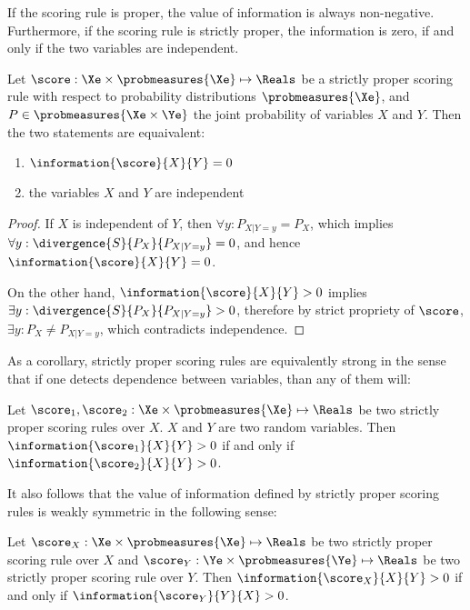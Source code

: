If the scoring rule is proper, the value of information is always non-negative. Furthermore, if the scoring rule is strictly proper, the information is zero, if and only if the two variables are independent.

\begin{theorem}
	Let $\score:\Xe\times\probmeasures{\Xe}\mapsto\Reals$ be a strictly proper scoring rule with respect to probability distributions $\probmeasures{\Xe}$, and $P\in\probmeasures{\Xe\times\Ye}$ the joint probability of variables $X$ and $Y$. Then the two statements are equaivalent:
	\begin{enumerate}
		\item $\information{\score}{X}{Y} = 0$
		\item the variables $X$ and $Y$ are independent
	\end{enumerate}
	\begin{proof}
		If $X$ is independent of $Y$, then $\forall y: P_{X\vert Y=y} = P_{X}$, which implies $\forall y:  \divergence{S}{P_{X}}{P_{X\vert Y=y}}=0$, and hence $\information{\score}{X}{Y} = 0$.
		
		On the other hand, $\information{\score}{X}{Y} > 0$ implies $\exists y: \divergence{S}{P_{X}}{P_{X\vert Y=y}} > 0$, therefore by strict propriety of $\score$, $\exists y: P_X \neq P_{X\vert Y=y}$, which contradicts independence.
	\end{proof}
\end{theorem}

As a corollary, strictly proper scoring rules are equivalently strong in the sense that if one detects dependence between variables, than any of them will:

\begin{corollary}
	Let $\score_1,\score_2:\Xe\times\probmeasures{\Xe}\mapsto\Reals$ be two strictly proper scoring rules over $X$. $X$ and $Y$ are two random variables. Then $\information{\score_1}{X}{Y} > 0$ if and only if $\information{\score_2}{X}{Y} > 0$.
\end{corollary}

It also follows that the value of information defined by strictly proper scoring rules is weakly symmetric in the following sense:

\begin{corollary}
	Let $\score_X:\Xe\times\probmeasures{\Xe}\mapsto\Reals$ be two strictly proper scoring rule over $X$ and $\score_Y:\Ye\times\probmeasures{\Ye}\mapsto\Reals$ be two strictly proper scoring rule over $Y$.  Then $\information{\score_X}{X}{Y} > 0$ if and only if $\information{\score_Y}{Y}{X} > 0$.
\end{corollary}

